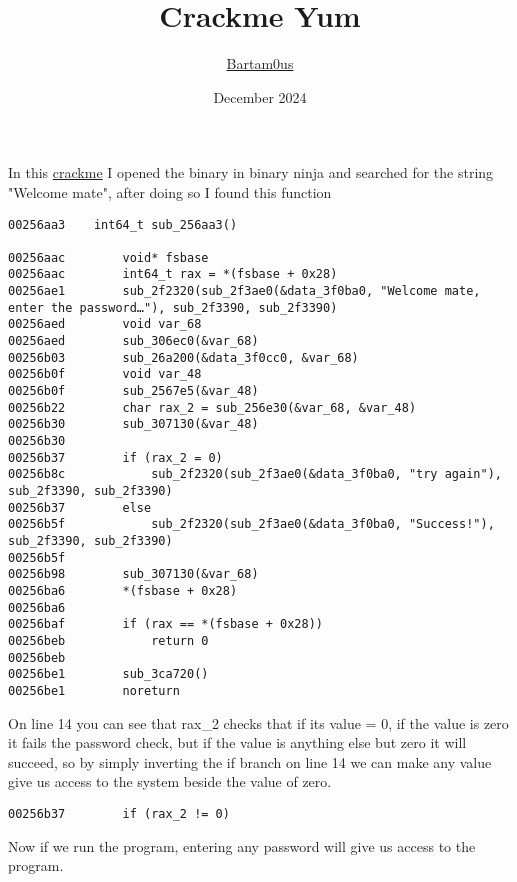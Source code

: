 \documentclass{article}
\title{Crackme Yum}
\author{\href{https://github.com/Bartamous}{Bartam0us}}
\date{December 2024}
\begin{document}
\maketitle

In this \href{https://crackmes.one/crackme/6754620160fa67152406b53c}{crackme} I opened the binary in binary ninja and searched for the string "Welcome mate", after doing so I found this function

\begin{verbatim}
00256aa3    int64_t sub_256aa3()

00256aac        void* fsbase
00256aac        int64_t rax = *(fsbase + 0x28)
00256ae1        sub_2f2320(sub_2f3ae0(&data_3f0ba0, "Welcome mate, enter the password…"), sub_2f3390, sub_2f3390)
00256aed        void var_68
00256aed        sub_306ec0(&var_68)
00256b03        sub_26a200(&data_3f0cc0, &var_68)
00256b0f        void var_48
00256b0f        sub_2567e5(&var_48)
00256b22        char rax_2 = sub_256e30(&var_68, &var_48)
00256b30        sub_307130(&var_48)
00256b30        
00256b37        if (rax_2 = 0)
00256b8c            sub_2f2320(sub_2f3ae0(&data_3f0ba0, "try again"), sub_2f3390, sub_2f3390)
00256b37        else
00256b5f            sub_2f2320(sub_2f3ae0(&data_3f0ba0, "Success!"), sub_2f3390, sub_2f3390)
00256b5f        
00256b98        sub_307130(&var_68)
00256ba6        *(fsbase + 0x28)
00256ba6        
00256baf        if (rax == *(fsbase + 0x28))
00256beb            return 0
00256beb        
00256be1        sub_3ca720()
00256be1        noreturn

\end{verbatim}
\newpage
On line 14 you can see that rax\_2 checks that if its value = 0, if the value is zero it fails the password check, but if the value is anything else but zero it will succeed, so by simply inverting the if branch on line 14 we can make any value give us access to the system beside the value of zero.
\begin{verbatim}
00256b37        if (rax_2 != 0)
\end{verbatim}
Now if we run the program, entering any password will give us access to the program.
\end{document}
